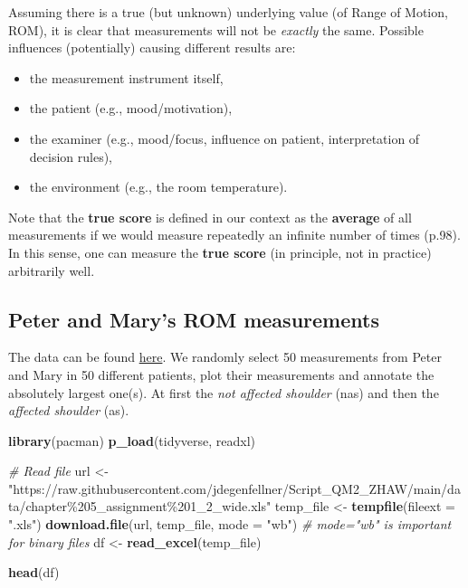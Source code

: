\documentclass[
]{book}
\newenvironment{Shaded}{\begin{snugshade}}{\end{snugshade}}
\newcommand{\AttributeTok}[1]{\textcolor[rgb]{0.13,0.29,0.53}{#1}}
\newcommand{\CommentTok}[1]{\textcolor[rgb]{0.56,0.35,0.01}{\textit{#1}}}
\newcommand{\FunctionTok}[1]{\textcolor[rgb]{0.13,0.29,0.53}{\textbf{#1}}}
\newcommand{\NormalTok}[1]{#1}
\newcommand{\OtherTok}[1]{\textcolor[rgb]{0.56,0.35,0.01}{#1}}
\newcommand{\StringTok}[1]{\textcolor[rgb]{0.31,0.60,0.02}{#1}}
\providecommand{\tightlist}{%
  \setlength{\itemsep}{0pt}\setlength{\parskip}{0pt}}
\begin{document}
Assuming there is a true (but unknown) underlying value (of Range of Motion, ROM),
it is clear that measurements will not be \emph{exactly} the same.
Possible influences (potentially) causing different results are:

\begin{itemize}
\tightlist
\item
  the measurement instrument itself,
\item
  the patient (e.g., mood/motivation),
\item
  the examiner (e.g., mood/focus, influence on patient, interpretation of decision rules),
\item
  the environment (e.g., the room temperature).
\end{itemize}

Note that the \textbf{true score} is defined in our context as the \textbf{average}
of all measurements if we would measure repeatedly an infinite number of times (p.98).
In this sense, one can measure the \textbf{true score} (in principle, not in practice)
arbitrarily well.

\subsection{Peter and Mary's ROM measurements}\label{peter-and-marys-rom-measurements}

The data can be found \href{http://www.clinimetrics.nl/answers-to-the-assignments-in-textbook_22_0.html}{here}.
We randomly select 50 measurements from Peter and Mary in 50 different patients,
plot their measurements and annotate the absolutely largest one(s). At first the
\emph{not affected shoulder} (nas) and then the \emph{affected shoulder} (as).

\begin{Shaded}
\begin{Highlighting}[]
\FunctionTok{library}\NormalTok{(pacman)}
\FunctionTok{p\_load}\NormalTok{(tidyverse, readxl)}

\CommentTok{\# Read file}
\NormalTok{url }\OtherTok{\textless{}{-}} \StringTok{"https://raw.githubusercontent.com/jdegenfellner/Script\_QM2\_ZHAW/main/data/chapter\%205\_assignment\%201\_2\_wide.xls"}
\NormalTok{temp\_file }\OtherTok{\textless{}{-}} \FunctionTok{tempfile}\NormalTok{(}\AttributeTok{fileext =} \StringTok{".xls"}\NormalTok{)}
\FunctionTok{download.file}\NormalTok{(url, temp\_file, }\AttributeTok{mode =} \StringTok{"wb"}\NormalTok{)  }\CommentTok{\# mode="wb" is important for binary files}
\NormalTok{df }\OtherTok{\textless{}{-}} \FunctionTok{read\_excel}\NormalTok{(temp\_file)}

\FunctionTok{head}\NormalTok{(df)}
\end{Highlighting}
\end{Shaded}
\end{document}
